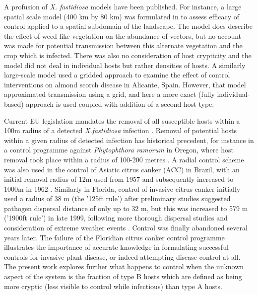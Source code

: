\documentclass[11pt,letterpaper]{article}
\begin{document}
A profusion of \emph{X. fastidiosa} models have been published. For instance, a large spatial scale model (400 km by 80 km) was formulated in \cite{Anita2021} to assess efficacy of control applied to a spatial subdomain of the landscape. The model does describe the effect of weed-like vegetation on the abundance of vectors, but no account was made for potential transmission between this alternate vegetation and the crop which is infected. There was also no consideration of host crypticity and the model did not deal in individual hosts but rather densities of hosts. A similarly large-scale model \cite{Cendoya2024} used a gridded approach to examine the effect of control interventions on almond scorch disease in Alicante, Spain. However, that model approximated transmission using a grid, and here a more exact (fully individual-based) approach is used coupled with addition of a second host type. 

Current EU legislation mandates the removal of all susceptible hosts within a 100m radius of a detected \emph{X.fastidiosa} infection \cite{Bragard2019}. Removal of potential hosts within a given radius of detected infection has historical precedent, for instance in a control programme against \emph{Phytophthora ramorum} in Oregon, where host removal took place within a radius of 100-200 metres \cite{Hansen2019}. A radial control scheme was also used in the control of Asiatic citrus canker (ACC) in Brazil, with an initial removal radius of 12m used from 1957 and subsequently increased to 1000m in 1962 \cite{Behlau2016}. Similarly in Florida, control of invasive citrus canker initially used a radius of 38 m (the '125ft rule') after preliminary studies suggested pathogen dispersal distance of only up to 32 m, but this was increased to 579 m ('1900ft rule') in late 1999, following more thorough dispersal studies and consideration of extreme weather events \cite{Gottwald2001}. Control was finally abandoned several years later. The failure of the Floridian citrus canker control programme illustrates the importance of accurate knowledge in formulating successful controls for invasive plant disease, or indeed attempting disease control at all. The present work explores further what happens to control when the unknown aspect of the system is the fraction of type B hosts which are defined as being more cryptic (less visible to control while infectious) than type A hosts. 
\end{document}
